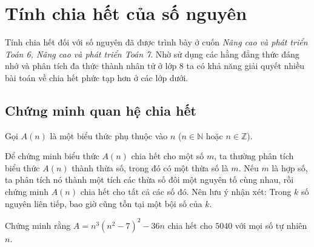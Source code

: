 \section{Tính chia hết của số nguyên}
Tính chia hết đối với số nguyên đã được trình bày ở cuốn \textit{Nâng cao và phát triển Toán 6, Nâng cao và phát triển Toán 7}. Nhờ sử dụng các hằng đẳng thức đáng nhớ và phân tích đa thức thành nhân tử ở lớp 8 ta có khả năng giải quyết nhiều bài toán về chia hết phức tạp hơn ở các lớp dưới.

\subsection{Chứng minh quan hệ chia hết}
Gọi $A(n)$ là một biểu thức phụ thuộc vào $n$ ($n\in \mathbb{N}$ hoặc $n\in \mathbb{Z}$).
\begin{note}
Để chứng minh biểu thức $A(n)$ chia hết cho một số $m$, ta thường phân tích biểu thức $A(n)$ thành thừa số, trong đó có một thừa số là $m$. Nếu $m$ là hợp số, ta phân tích nó thành một tích các thừa số đôi một nguyên tố cùng nhau, rồi chứng minh $A(n)$ chia hết cho tất cả các số đó. Nên lưu ý nhận xét: Trong $k$ số nguyên liên tiếp, bao giờ cũng tồn tại một bội số của $k$.
\end{note}

\begin{vd}%
Chứng minh rằng $A=n^3\left(n^2-7\right)^2-36n$ chia hết cho $5040$ với mọi số tự nhiên $n$.
\end{vd}

